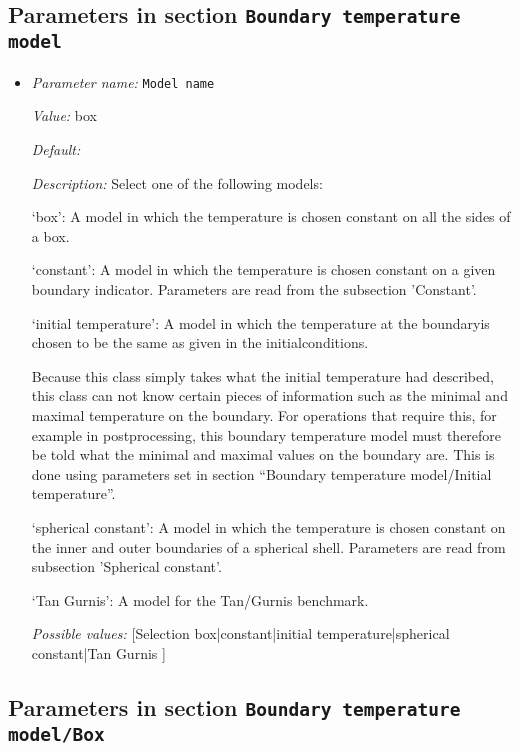 \subsection{Parameters in section \tt Boundary temperature model}
\label{parameters:Boundary_20temperature_20model}

\begin{itemize}
\item {\it Parameter name:} {\tt Model name}


{\it Value:} box


{\it Default:} 


{\it Description:} Select one of the following models:

`box': A model in which the temperature is chosen constant on all the sides of a box.

`constant': A model in which the temperature is chosen constant on a given boundary indicator.  Parameters are read from the subsection 'Constant'.

`initial temperature': A model in which the temperature at the boundaryis chosen to be the same as given in the initialconditions.

Because this class simply takes what the initial temperature had described, this class can not know certain pieces of information such as the minimal and maximal temperature on the boundary. For operations that require this, for example in postprocessing, this boundary temperature model must therefore be told what the minimal and maximal values on the boundary are. This is done using parameters set in section ``Boundary temperature model/Initial temperature''.

`spherical constant': A model in which the temperature is chosen constant on the inner and outer boundaries of a spherical shell. Parameters are read from subsection 'Spherical constant'.

`Tan Gurnis': A model for the Tan/Gurnis benchmark.


{\it Possible values:} [Selection box|constant|initial temperature|spherical constant|Tan Gurnis ]
\end{itemize}



\subsection{Parameters in section \tt Boundary temperature model/Box}
\label{parameters:Boundary_20temperature_20model/Box}

